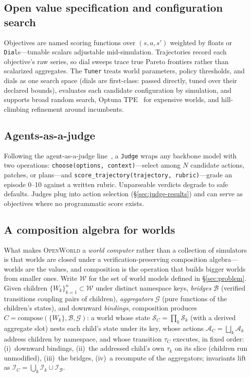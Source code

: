 \documentclass[11pt]{article}
\newcommand{\openworld}{\textsc{OpenWorld}}
\begin{document}
\subsection{Open value specification and configuration search}
Objectives are named scoring functions over $(s, a, s')$ weighted by floats or
\texttt{Dial}s---tunable scalars adjustable mid-simulation. Trajectories
record each objective's raw series, so dial sweeps trace true Pareto frontiers
rather than scalarized aggregates. The \texttt{Tuner} treats world parameters,
policy thresholds, and dials as one search space (dials are first-class:
passed directly, tuned over their declared bounds), evaluates each candidate
configuration by simulation, and supports broad random search, Optuna
TPE~\cite{optuna2019} for expensive worlds, and hill-climbing refinement
around incumbents.

\subsection{Agents-as-a-judge}
Following the agent-as-a-judge line~\cite{agentasjudge2024,llmjudge2023}, a
\texttt{Judge} wraps any backbone model with two operations:
\texttt{choose(options, context)}---select among $N$ candidate actions,
patches, or plans---and \texttt{score\_trajectory(trajectory,
rubric)}---grade an episode 0--10 against a written rubric. Unparseable
verdicts degrade to safe defaults. Judges plug into action selection
(\S\ref{sec:judge-results}) and can serve as objectives where no programmatic
score exists.

\subsection{A composition algebra for worlds}\label{sec:algebra}
What makes \openworld{} a \emph{world computer} rather than a collection of simulators is that
worlds are closed under a verification-preserving composition algebra---worlds are the values, and
composition is the operation that builds bigger worlds from smaller ones. Write $\mathcal{W}$ for
the set of world models defined in \S\ref{sec:problem}. Given children $\{W_k\}_{k=1}^{n}\subset\mathcal{W}$ under distinct namespace
keys, \emph{bridges} $\mathcal{B}$ (verified transitions coupling pairs of children),
\emph{aggregators} $\mathcal{G}$ (pure functions of the children's states), and downward
\emph{bindings}, composition
produces $C=\mathrm{compose}(\{W_k\},\mathcal{B},\mathcal{G})$: a world whose state
$\mathcal{S}_C=\prod_k \mathcal{S}_k$ (with a derived aggregate slot) nests each child's state under
its key, whose actions $\mathcal{A}_C=\bigsqcup_k \mathcal{A}_k$ address children by namespace, and
whose transition $\tau_C$ executes, in fixed order: (i)~downward bindings, (ii)~the addressed
child's own $\tau_k$ on its slice (children run unmodified), (iii)~the bridges, (iv)~a
recompute of the aggregators; invariants lift as $\mathcal{I}_C=\bigcup_k\mathcal{I}_k\cup\mathcal{I}_{\mathcal{B}}$.
\end{document}
